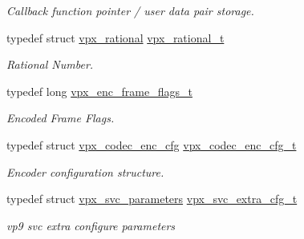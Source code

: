 \begin{DoxyCompactItemize}
\begin{DoxyCompactList}\small\item\em Callback function pointer / user data pair storage. \end{DoxyCompactList}\item 
typedef struct \hyperlink{structvpx__rational}{vpx\+\_\+rational} \hyperlink{group__encoder_ga2c08c6d71202024f17a5aef71a3d13e5}{vpx\+\_\+rational\+\_\+t}
\begin{DoxyCompactList}\small\item\em Rational Number. \end{DoxyCompactList}\item 
typedef long \hyperlink{group__encoder_ga99e4a3c966f0de19fe1aa626bd860366}{vpx\+\_\+enc\+\_\+frame\+\_\+flags\+\_\+t}
\begin{DoxyCompactList}\small\item\em Encoded Frame Flags. \end{DoxyCompactList}\item 
typedef struct \hyperlink{structvpx__codec__enc__cfg}{vpx\+\_\+codec\+\_\+enc\+\_\+cfg} \hyperlink{group__encoder_ga946236c809e493b31a815d82db1e59db}{vpx\+\_\+codec\+\_\+enc\+\_\+cfg\+\_\+t}
\begin{DoxyCompactList}\small\item\em Encoder configuration structure. \end{DoxyCompactList}\item 
typedef struct \hyperlink{structvpx__svc__parameters}{vpx\+\_\+svc\+\_\+parameters} \hyperlink{group__encoder_gaa7648cca6bd9745ea80ffb67c32d39ea}{vpx\+\_\+svc\+\_\+extra\+\_\+cfg\+\_\+t}
\begin{DoxyCompactList}\small\item\em vp9 svc extra configure parameters \end{DoxyCompactList}\end{DoxyCompactItemize}
